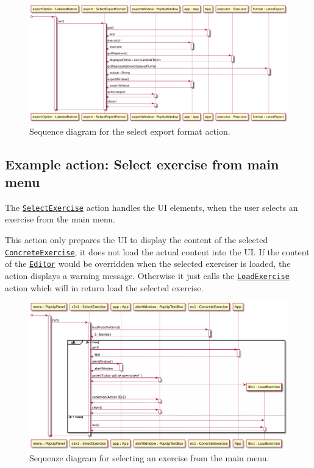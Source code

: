 \begin{figure}[H]
	\centering
	\includegraphics[width=\textwidth]{sequenceDiagrams/exportOutput}
	\caption{Sequence diagram for the select export format action.}
\end{figure}

\subsection{Example action: Select exercise from main menu}
The \texttt{\hyperref[type:edu.kit.wavelength.client.view.action.SelectExercise]{SelectExercise}} 
action handles the UI elements, when the user selects an exercise from the main menu.

This action only prepares the UI to display the content of the selected \texttt{\hyperref[type:edu.kit.wavelength.client.view.exercise.ConcreteExercise]{ConcreteExercise}}, 
it does not load the actual content into the UI. If the content of the \texttt{\hyperref[type:edu.kit.wavelength.client.view.webui.component.Editor]{Editor}} would 
be overridden when the selected exerciser is loaded, the action displays a warning
message. Otherwise it just calls the \texttt{\hyperref[type:edu.kit.wavelength.client.view.action.LoadExercise]{LoadExercise}} 
action which will in return load the selected exercise.

\begin{figure}[H]
	\centering
	\includegraphics[width=\textwidth]{sequenceDiagrams/selectExercise}
	\caption{Sequenze diagram for selecting an exercise from the main menu.}
\end{figure}

